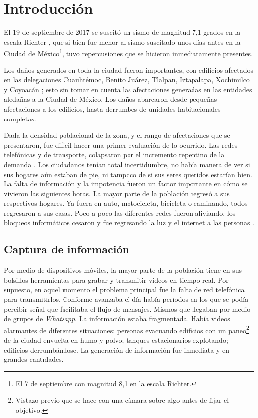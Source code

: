 \documentclass[12pt,spanish,oneside,breaklinks]{book}
\begin{document}


\frontmatter

\tableofcontents

\mainmatter

\chapter{Introducción}
\label{sec:org504c50c}

El 19 de septiembre de 2017 se suscitó un sismo de magnitud 7,1 grados en la escala Richter \cite{cnn}, que si bien fue menor al sismo suscitado unos días antes en la Ciudad de México\footnote{El 7 de septiembre con magnitud 8,1 en la escala Richter.}, tuvo repercusiones que se hicieron inmediatamente presentes.

Los daños generados en toda la ciudad fueron importantes, con edificios afectados en las delegaciones Cuauhtémoc, Benito Juárez, Tlalpan, Iztapalapa, Xochimilco y Coyoacán \cite{ap19s}; esto sin tomar en cuenta las afectaciones  generadas en las entidades aledañas a la Ciudad de México. Los daños abarcaron desde pequeñas afectaciones a los edificios, hasta derrumbes de unidades habitacionales completas.

Dada la densidad poblacional de la zona, y el rango de afectaciones que se presentaron, fue difícil hacer una primer evaluación de lo ocurrido. Las redes telefónicas y de transporte, colapsaron por el incremento repentino de la demanda \cite{telcom19s}. Los ciudadanos tenían total incertidumbre, no había manera de ver si sus hogares aún estaban de pie, ni tampoco de si sus seres queridos estarían bien. La falta de información y la impotencia fueron un factor importante en cómo se vivieron las siguientes horas. La mayor parte de la población regresó a sus respectivos hogares. Ya fuera en auto, motocicleta, bicicleta o caminando, todos regresaron a sus casas. Poco a poco las diferentes redes fueron aliviando, los bloqueos informáticos cesaron y fue regresando la luz y el internet a las personas \cite{ift}.

\section{Captura de información}
\label{sec:org8aaf370}

Por medio de dispositivos móviles, la mayor parte de la población tiene en sus bolsillos herramientas para grabar y transmitir videos en tiempo real. Por supuesto, en aquel momento el problema principal fue la falta de red telefónica para transmitirlos. Conforme avanzaba el día había periodos en los que se podía percibir señal que facilitaba el flujo de mensajes. Mismos que llegaban por medio de grupos de \emph{Whatsapp}. La información estaba fragmentada. Había videos alarmantes de diferentes situaciones: personas evacuando edificios con un paneo\footnote{Vistazo previo que se hace con una cámara sobre algo antes de fijar el objetivo.} de la ciudad envuelta en  humo y polvo; tanques estacionarios explotando; edificios derrumbándose. La generación de información fue inmediata y en grandes cantidades.
\end{document}
